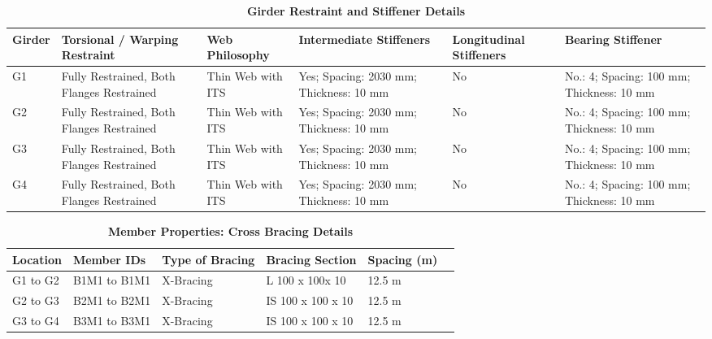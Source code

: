 \documentclass[12pt,a4paper]{report}
\numberwithin{table}{chapter}
\numberwithin{figure}{chapter}
\begin{document}
\vspace{4pt}
\begin{longtable}{|L{1.4cm}|p{2.2cm}|p{2.2cm}|p{3.0cm}|p{2.4cm}|p{2.2cm}|}
\caption{\textbf{Girder Restraint and Stiffener Details}}\\
\hline
\textbf{Girder} & \textbf{Torsional / Warping Restraint} & \textbf{Web Philosophy} & \textbf{Intermediate Stiffeners} & \textbf{Longitudinal Stiffeners} & \textbf{Bearing Stiffener} \\[6pt]
\hline
\endfirsthead
\endhead

G1 & Fully Restrained, Both Flanges Restrained & Thin Web with ITS & Yes; Spacing: 2030 mm; Thickness: 10 mm & No & No.: 4; Spacing: 100 mm; Thickness: 10 mm \\[8pt]
\hline
G2 & Fully Restrained, Both Flanges Restrained & Thin Web with ITS & Yes; Spacing: 2030 mm; Thickness: 10 mm & No & No.: 4; Spacing: 100 mm; Thickness: 10 mm \\[8pt]
\hline
G3 & Fully Restrained, Both Flanges Restrained & Thin Web with ITS & Yes; Spacing: 2030 mm; Thickness: 10 mm & No & No.: 4; Spacing: 100 mm; Thickness: 10 mm \\[8pt]
\hline
G4 & Fully Restrained, Both Flanges Restrained & Thin Web with ITS & Yes; Spacing: 2030 mm; Thickness: 10 mm & No & No.: 4; Spacing: 100 mm; Thickness: 10 mm \\[8pt]
\hline
\end{longtable}



\newpage

\vspace{0.4em}
\setlength{\tabcolsep}{4pt}
\setlength\LTleft{0pt}
\setlength\LTright{\fill}

\begin{longtable}{|L{2.2cm}|L{2.2cm}|L{3.0cm}|L{2.5cm}|C{1.8cm}|C{1.8cm}|}
\caption{\textbf{Member Properties: Cross Bracing Details}}
\hline
\textbf{Location} & \textbf{Member IDs} & \textbf{Type of Bracing} & \textbf{Bracing Section} & \textbf{Spacing (m)} \\
\hline
G1 to G2 & B1M1 to B1M1 & X-Bracing & L 100 x 100x 10 & 12.5 m \\[6pt]
\hline
G2 to G3 & B2M1 to B2M1 & X-Bracing & IS 100 x 100 x 10 & 12.5 m \\[6pt]
\hline
G3 to G4 & B3M1 to B3M1 & X-Bracing & IS 100 x 100 x 10 & 12.5 m \\[6pt]
\hline
\end{longtable}

\vspace{0.4em}
\noindent
\setlength{\tabcolsep}{4pt}
\setlength\LTleft{0pt}
\setlength\LTright{\fill}
\end{document}
